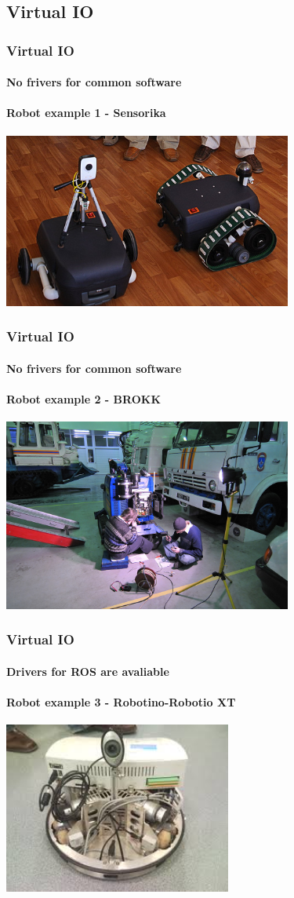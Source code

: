\documentclass{beamer}
\begin{document}
\subsection{Virtual IO}
\begin{frame}
\frametitle{Virtual IO}
\framesubtitle{No frivers for common software}
\framesubtitle{Robot example 1 - Sensorika}
\includegraphics[width=9.5cm]{rob1.jpg}
\end{frame}

\begin{frame}
\frametitle{Virtual IO}
\framesubtitle{No frivers for common software}
\framesubtitle{Robot example 2 - BROKK}
\includegraphics[width=9.5cm]{robot_big.jpg}
\end{frame}

\begin{frame}
\frametitle{Virtual IO}
\framesubtitle{Drivers for ROS are avaliable}
\framesubtitle{Robot example 3 - Robotino-Robotio XT}
\includegraphics[width=7.5cm]{robotino.jpg}
\end{frame}
\end{document}
